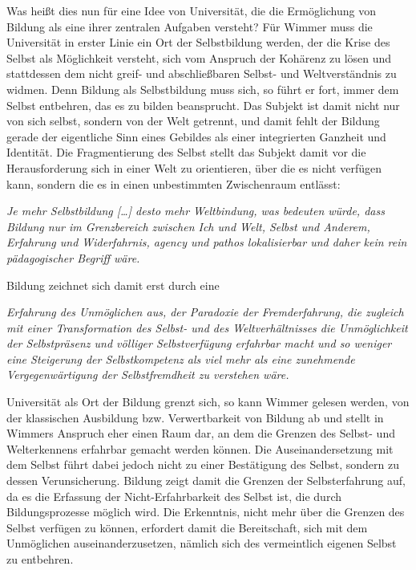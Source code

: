 Was heißt dies nun für eine Idee von Universität,
die die Ermöglichung von Bildung als eine ihrer zentralen Aufgaben versteht?
Für Wimmer muss die Universität in erster Linie ein Ort der Selbstbildung
werden, der die Krise des Selbst als Möglichkeit versteht, sich vom Anspruch
der Kohärenz zu lösen und stattdessen dem nicht greif- und abschließbaren
Selbst- und Weltverständnis zu widmen.  Denn Bildung als Selbstbildung muss
sich, so führt er fort, immer dem Selbst entbehren, das es zu bilden
beansprucht. Das Subjekt ist damit nicht nur von sich selbst, sondern von der
Welt getrennt, und damit fehlt der Bildung \glqq gerade der eigentliche Sinn eines
Gebildes als einer integrierten Ganzheit und Identität.\grqq\footnotemark {}  Die Fragmentierung
des Selbst stellt das Subjekt damit vor die Herausforderung sich in einer Welt
zu orientieren, über die es nicht verfügen kann, sondern die es in einen
unbestimmten Zwischenraum entlässt: 
\begin{myenv}
  \textit{ \glqq Je mehr Selbstbildung […] desto mehr
Weltbindung, was bedeuten würde, dass Bildung nur im Grenzbereich zwischen Ich
und Welt, Selbst und Anderem, Erfahrung und Widerfahrnis, agency und pathos
lokalisierbar und daher kein rein pädagogischer Begriff wäre.\grqq}
\footnotemark {}  
\end{myenv}

Bildung
zeichnet sich damit erst durch eine 
\begin{myenv}
  \textit{\glqq [...]Erfahrung des Unmöglichen aus, der
Paradoxie der Fremderfahrung, die zugleich mit einer Transformation des Selbst-
und des Weltverhältnisses die Unmöglichkeit der Selbstpräsenz und völliger
Selbstverfügung erfahrbar macht und so weniger eine Steigerung der
Selbstkompetenz als viel mehr als eine zunehmende Vergegenwärtigung der
Selbstfremdheit zu verstehen wäre.\grqq}
\footnotemark {}  
\end{myenv}

Universität als Ort der Bildung grenzt sich, so kann Wimmer gelesen werden, von
der klassischen Ausbildung bzw. Verwertbarkeit von Bildung ab und stellt in
Wimmers Anspruch eher einen Raum dar, an dem die Grenzen des Selbst- und
Welterkennens erfahrbar gemacht werden können. Die Auseinandersetzung mit dem
Selbst führt dabei jedoch nicht zu einer Bestätigung des Selbst, sondern zu
dessen Verunsicherung. Bildung zeigt damit die Grenzen der Selbsterfahrung auf,
da es die Erfassung der Nicht-Erfahrbarkeit des Selbst ist, die durch
Bildungsprozesse möglich wird. Die Erkenntnis, nicht mehr über die Grenzen des
Selbst verfügen zu können, erfordert damit die Bereitschaft, sich mit dem
Unmöglichen auseinanderzusetzen, nämlich sich des vermeintlich eigenen Selbst
zu entbehren.  

